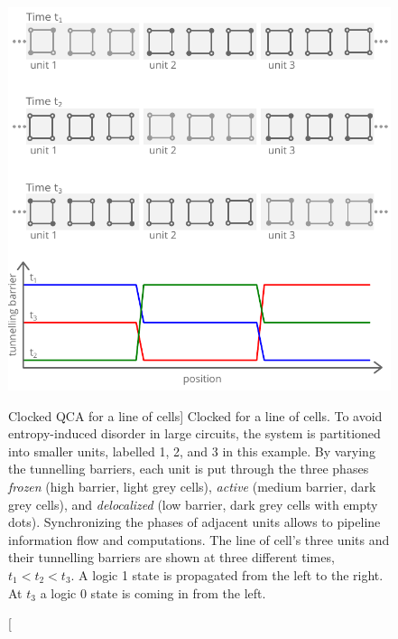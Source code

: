 \begin{figure}
  \center
  \includegraphics{clocking}
  \caption
[Clocked QCA for a line of cells]
{
\label{fig:clocking}
Clocked  for a line of cells. To avoid entropy-induced disorder in large 
circuits, the system is partitioned into smaller units, labelled 1, 2, and 3 in
this example. By varying the tunnelling barriers, each unit is put through the
three phases \emph{frozen} (high barrier, light grey cells), \emph{active}
(medium barrier, dark grey cells), and \emph{delocalized} (low barrier, dark
grey cells with empty dots). Synchronizing the phases of adjacent units allows
to pipeline information flow and computations. The line of cell's three units
and their tunnelling barriers are shown at three different times, $t_1<t_2<t_3$.
A logic 1 state is propagated from the left to the right. At $t_3$ a logic 0
state is coming in from the left.
}
\end{figure}

